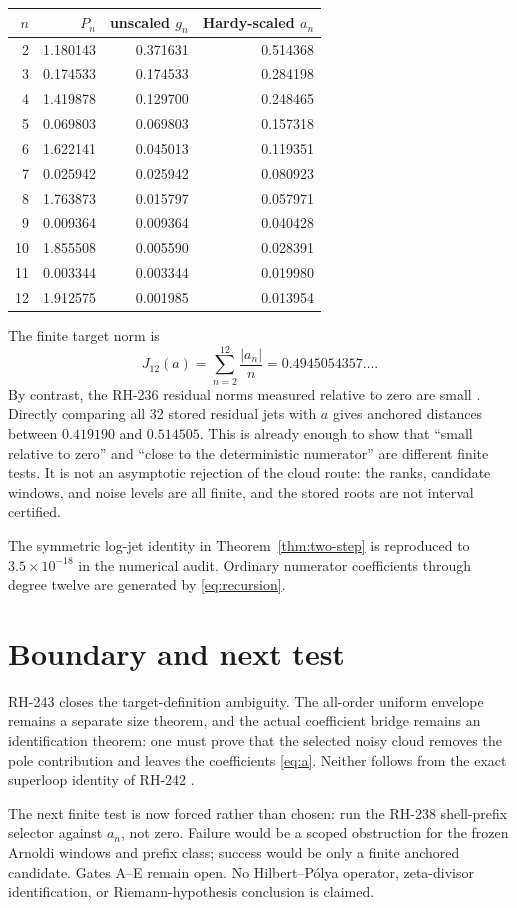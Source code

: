 \documentclass[11pt]{article}
\theoremstyle{remark}
\begin{document}
\begin{center}
\small
\begin{tabular}{rrrr}
\toprule
$n$ & $P_n$ & unscaled $g_n$ & Hardy-scaled $a_n$\\
\midrule
2  & 1.180143 & 0.371631 & 0.514368\\
3  & 0.174533 & 0.174533 & 0.284198\\
4  & 1.419878 & 0.129700 & 0.248465\\
5  & 0.069803 & 0.069803 & 0.157318\\
6  & 1.622141 & 0.045013 & 0.119351\\
7  & 0.025942 & 0.025942 & 0.080923\\
8  & 1.763873 & 0.015797 & 0.057971\\
9  & 0.009364 & 0.009364 & 0.040428\\
10 & 1.855508 & 0.005590 & 0.028391\\
11 & 0.003344 & 0.003344 & 0.019980\\
12 & 1.912575 & 0.001985 & 0.013954\\
\bottomrule
\end{tabular}
\end{center}

The finite target norm is
\[
 J_{12}(a)=\sum_{n=2}^{12}\frac{|a_n|}{n}=0.4945054357\ldots .
\]
By contrast, the RH-236 residual norms measured relative to zero are small
\citep{WangRH236}.  Directly comparing all 32 stored residual jets with $a$
gives anchored distances between $0.419190$ and $0.514505$.  This is already
enough to show that ``small relative to zero'' and ``close to the deterministic
numerator'' are different finite tests.  It is not an asymptotic rejection of
the cloud route: the ranks, candidate windows, and noise levels are all
finite, and the stored roots are not interval certified.

The symmetric log-jet identity in Theorem~\ref{thm:two-step} is reproduced to
$3.5\times10^{-18}$ in the numerical audit.  Ordinary numerator coefficients
through degree twelve are generated by \eqref{eq:recursion}.

\section{Boundary and next test}

RH-243 closes the target-definition ambiguity.  The all-order uniform
envelope remains a separate size theorem, and the actual coefficient bridge
remains an identification theorem: one must prove that the selected noisy
cloud removes the pole contribution and leaves the coefficients
\eqref{eq:a}.  Neither follows from the exact superloop identity of RH-242
\citep{WangRH242}.

The next finite test is now forced rather than chosen: run the RH-238
shell-prefix selector against $a_n$, not zero.  Failure would be a scoped
obstruction for the frozen Arnoldi windows and prefix class; success would be
only a finite anchored candidate.  Gates A--E remain open.  No
Hilbert--P\'olya operator, zeta-divisor identification, or Riemann-hypothesis
conclusion is claimed.



\end{document}
